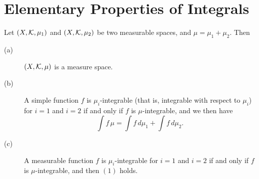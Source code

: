 \section{Elementary Properties of Integrals}
\begin{pro}%
	Let $(X,\mathcal{K},\mu_1)$ and $(X,\mathcal{K},\mu_2)$ be two measurable spaces, and $\mu=\mu_1+\mu_2$. Then
	\begin{description}
	\item[(a)] $(X,\mathcal{K},\mu)$ is a measure space.
	\item[(b)] A simple function $f$ is $\mu_i$-integrable (that is, integrable with respect to $\mu_i$) for $i=1$ and $i=2$ if and only if $f$ is $\mu$-integrable, and we then have
	\[\int f\,\mu=\int f\,d\mu_1+\int f\,d\mu_2.\tag{1}\]
	\item[(c)] A measurable function $f$ is $\mu_i$-integrable for $i=1$ and $i=2$ if and only if $f$ is $\mu$-integrable, and then $(1)$ holds.
	\end{description}
\end{pro}

